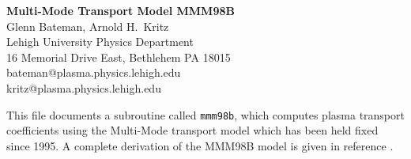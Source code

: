%
 
\headheight 0pt \headsep 0pt  \topmargin 0pt  \oddsidemargin 0pt
\textheight 9.0in \textwidth 6.5in

\begin{center}
\Large {\bf Multi-Mode Transport Model MMM98B} \\
\vspace{1pc} \normalsize
Glenn Bateman, Arnold H.~Kritz \\
 Lehigh University Physics Department \\
16 Memorial Drive East, Bethlehem PA 18015 \\
bateman@plasma.physics.lehigh.edu \\
kritz@plasma.physics.lehigh.edu
\end{center}

This file documents a subroutine called {\tt mmm98b}, which computes
plasma transport coefficients using the Multi-Mode transport model
which has been held fixed since 1995.  A complete derivation of the
MMM98B model is given in reference \cite{bate98a}.

